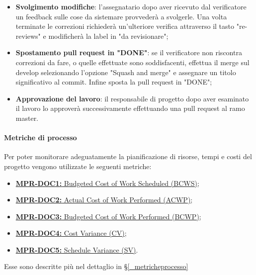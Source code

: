 \begin{itemize}
    \item \textbf{Svolgimento modifiche}: l'assegnatario dopo aver ricevuto dal verificatore un feedback sulle cose da sistemare provvederà a svolgerle. Una volta terminate le correzioni richiederà un'ulteriore verifica attraverso il tasto "re-reviews" e modificherà la label in "da revisionare";
    \item \textbf{Spostamento pull request in "DONE"}: se il verificatore non riscontra correzioni da fare, o quelle effettuate sono soddisfacenti, effettua il merge sul develop selezionando l'opzione "Squash and merge" e assegnare un titolo significativo al commit. Infine sposta la pull request in "DONE";
    \item \textbf{Approvazione del lavoro}: il responsabile di progetto dopo aver esaminato il lavoro lo approverà successivamente effettuando una pull request al ramo master.
\end{itemize}
\paragraph{Metriche di processo}
Per poter monitorare adeguatamente la pianificazione di risorse, tempi e costi del progetto vengono utilizzate le seguenti metriche:
\begin{itemize}
    \item \hyperref[_MPR-DOC1]{\textbf{MPR-DOC1:} Budgeted Cost of Work Scheduled (BCWS)};
    \item \hyperref[_MPR-DOC2]{\textbf{MPR-DOC2:} Actual Cost of Work Performed (ACWP)};
    \item \hyperref[_MPR-DOC3]{\textbf{MPR-DOC3:} Budgeted Cost of Work Performed (BCWP)};
    \item \hyperref[_MPR-DOC4]{\textbf{MPR-DOC4:} Cost Variance (CV)};
    \item \hyperref[_MPR-DOC5]{\textbf{MPR-DOC5:} Schedule Variance (SV)}.
\end{itemize}
Esse sono descritte più nel dettaglio in \S\ref{_metricheprocesso}
